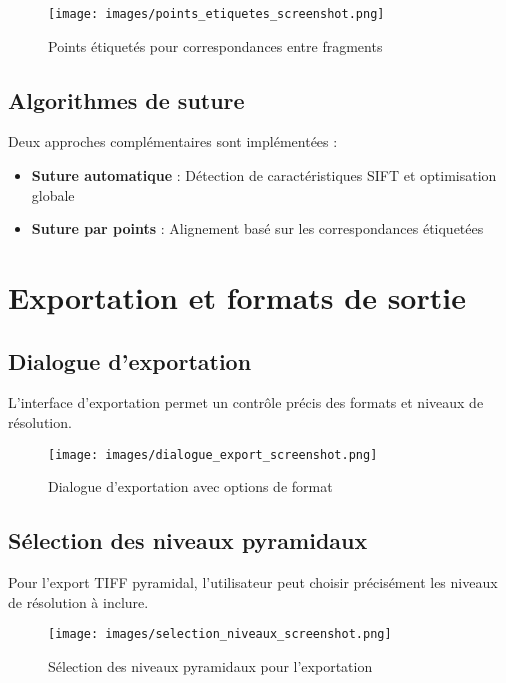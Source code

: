 \documentclass[11pt,a4paper]{report}
\begin{document}
\begin{figure}[htbp]
\centering
\texttt{[image: images/points\_etiquetes\_screenshot.png]}
\caption{Points étiquetés pour correspondances entre fragments}
\end{figure}

\subsection{Algorithmes de suture}

Deux approches complémentaires sont implémentées :

\begin{itemize}
\item \textbf{Suture automatique} : Détection de caractéristiques SIFT et optimisation globale
\item \textbf{Suture par points} : Alignement basé sur les correspondances étiquetées
\end{itemize}

\section{Exportation et formats de sortie}

\subsection{Dialogue d'exportation}

L'interface d'exportation permet un contrôle précis des formats et niveaux de résolution.

\begin{figure}[htbp]
\centering
\texttt{[image: images/dialogue\_export\_screenshot.png]}
\caption{Dialogue d'exportation avec options de format}
\end{figure}

\subsection{Sélection des niveaux pyramidaux}

Pour l'export TIFF pyramidal, l'utilisateur peut choisir précisément les niveaux de résolution à inclure.

\begin{figure}[htbp]
\centering
\texttt{[image: images/selection\_niveaux\_screenshot.png]}
\caption{Sélection des niveaux pyramidaux pour l'exportation}
\end{figure}
\end{document}
